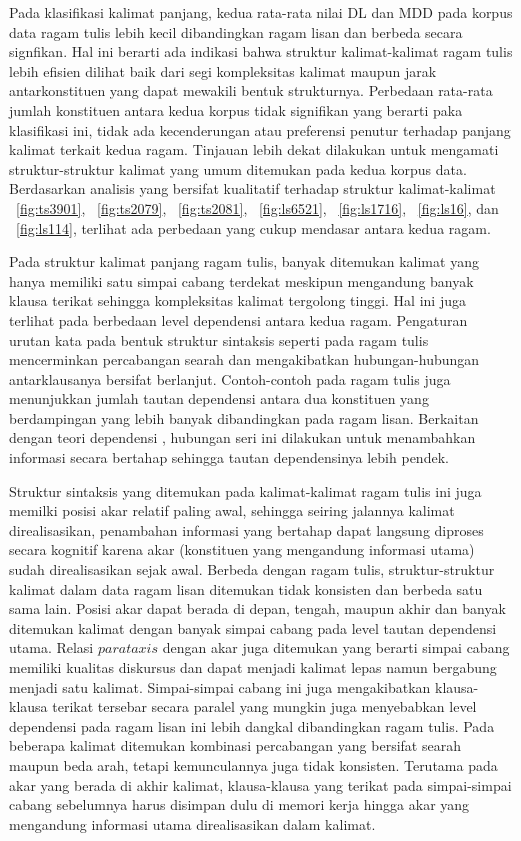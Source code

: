 Pada klasifikasi kalimat panjang, kedua rata-rata nilai DL dan MDD pada korpus data ragam tulis lebih kecil dibandingkan ragam lisan dan berbeda secara signfikan. Hal ini berarti ada indikasi bahwa struktur kalimat-kalimat ragam tulis lebih efisien dilihat baik dari segi kompleksitas kalimat maupun jarak antarkonstituen yang dapat mewakili bentuk strukturnya. Perbedaan rata-rata jumlah konstituen antara kedua korpus tidak signifikan yang berarti paka klasifikasi ini, tidak ada kecenderungan atau preferensi penutur terhadap panjang kalimat terkait kedua ragam. Tinjauan lebih dekat dilakukan untuk mengamati struktur-struktur kalimat yang umum ditemukan pada kedua korpus data. Berdasarkan analisis yang bersifat kualitatif terhadap struktur kalimat-kalimat \pic~\ref{fig:ts3901}, \pic~\ref{fig:ts2079}, \pic~\ref{fig:ts2081}, \pic~\ref{fig:ls6521}, \pic~\ref{fig:ls1716}, \pic~\ref{fig:ls16}, dan \pic~\ref{fig:ls114}, terlihat ada perbedaan yang cukup mendasar antara kedua ragam. 

Pada struktur kalimat panjang ragam tulis, banyak ditemukan kalimat yang hanya memiliki satu simpai cabang terdekat meskipun mengandung banyak klausa terikat sehingga kompleksitas kalimat tergolong tinggi. Hal ini juga terlihat pada berbedaan level dependensi antara kedua ragam. Pengaturan urutan kata pada bentuk struktur sintaksis seperti pada ragam tulis mencerminkan percabangan searah dan mengakibatkan hubungan-hubungan antarklausanya bersifat berlanjut. Contoh-contoh pada ragam tulis juga menunjukkan jumlah tautan dependensi antara dua konstituen yang berdampingan yang lebih banyak dibandingkan pada ragam lisan. Berkaitan dengan teori dependensi \citep{tesniere1959elements, hawkins2014cross, gildea2010grammars}, hubungan seri ini dilakukan untuk menambahkan informasi secara bertahap sehingga tautan dependensinya lebih pendek. 

Struktur sintaksis yang ditemukan pada kalimat-kalimat ragam tulis ini juga memilki posisi akar relatif paling awal, sehingga seiring jalannya kalimat direalisasikan, penambahan informasi yang bertahap dapat langsung diproses secara kognitif karena akar (konstituen yang mengandung informasi utama) sudah direalisasikan sejak awal. Berbeda dengan ragam tulis, struktur-struktur kalimat dalam data ragam lisan ditemukan tidak konsisten dan berbeda satu sama lain. Posisi akar dapat berada di depan, tengah, maupun akhir dan banyak ditemukan kalimat dengan banyak simpai cabang pada level tautan dependensi utama. Relasi $parataxis$ dengan akar juga ditemukan yang berarti simpai cabang memiliki kualitas diskursus dan dapat menjadi kalimat lepas namun bergabung menjadi satu kalimat. Simpai-simpai cabang ini juga mengakibatkan klausa-klausa terikat tersebar secara paralel yang mungkin juga menyebabkan level dependensi pada ragam lisan ini lebih dangkal dibandingkan ragam tulis. Pada beberapa kalimat ditemukan kombinasi percabangan yang bersifat searah maupun beda arah, tetapi kemunculannya juga tidak konsisten. Terutama pada akar yang berada di akhir kalimat, klausa-klausa yang terikat pada simpai-simpai cabang sebelumnya harus disimpan dulu di memori kerja hingga akar yang mengandung informasi utama direalisasikan dalam kalimat. 

